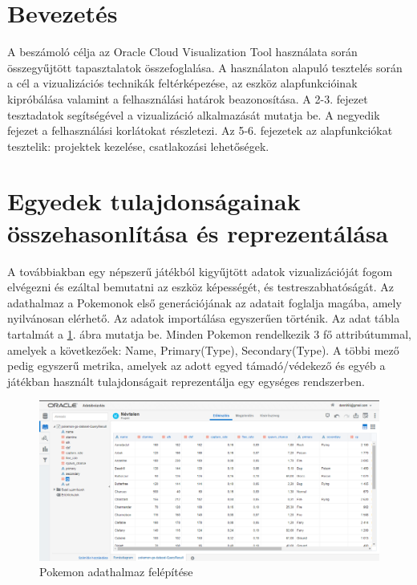 \section{Bevezetés}
A beszámoló célja az Oracle Cloud Visualization Tool használata során összegyűjtött tapasztalatok összefoglalása. A használaton alapuló tesztelés során a cél a vizualizációs technikák feltérképezése, az eszköz alapfunkcióinak kipróbálása valamint a felhasználási határok beazonosítása. A 2-3. fejezet tesztadatok segítségével a vizualizáció alkalmazását mutatja be. A negyedik fejezet a felhasználási korlátokat részletezi. Az 5-6. fejezetek az alapfunkciókat tesztelik: projektek kezelése, csatlakozási lehetőségek.
\section{Egyedek tulajdonságainak összehasonlítása és reprezentálása}
A továbbiakban egy népszerű játékból kigyűjtött adatok vizualizációját fogom elvégezni és ezáltal bemutatni az eszköz képességét, és testreszabhatóságát. Az adathalmaz a Pokemonok első generációjának az adatait foglalja magába, amely nyilvánosan elérhető. Az adatok importálása egyszerűen történik. Az adat tábla tartalmát a \ref{fig:pokedata}. ábra mutatja be. Minden Pokemon rendelkezik 3 fő attribútummal, amelyek a következőek: Name, Primary(Type), Secondary(Type). A többi mező pedig egyszerű metrika, amelyek az adott egyed támadó/védekező és egyéb a játékban használt tulajdonságait reprezentálja egy egységes rendszerben. 

\begin{figure}[h!]
	\centering
	\includegraphics[width=1.0\linewidth]{dani_imgs/poke_data}
	\caption{Pokemon adathalmaz felépítése}
	\label{fig:pokedata}
\end{figure}

